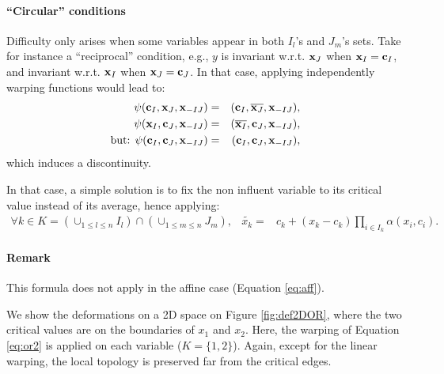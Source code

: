 \paragraph{``Circular'' conditions}
Difficulty only arises when some variables appear in both $I_l$'s and $J_m$'s sets. Take for instance a ``reciprocal'' condition, 
e.g., $y$ is invariant w.r.t. $\mathbf{x}_J$ when $\mathbf{x}_I=\mathbf{c}_I$, and invariant w.r.t. $\mathbf{x}_I$ when $\mathbf{x}_J=\mathbf{c}_J$.
In that case, applying independently warping functions would lead to: 
\begin{eqnarray*}
 \psi(\mathbf{c}_I, \mathbf{x}_J, \mathbf{x}_{-IJ}) &=& (\mathbf{c}_I, \overline{\mathbf{x}_J}, \mathbf{x}_{-IJ}),\\
 \psi(\mathbf{x}_I, \mathbf{c}_J, \mathbf{x}_{-IJ}) &=& (\overline{\mathbf{x}_I}, \mathbf{c}_J, \mathbf{x}_{-IJ}),\\
 \text{but: } \psi(\mathbf{c}_I, \mathbf{c}_J, \mathbf{x}_{-IJ}) &=& (\mathbf{c}_I, \mathbf{c}_J, \mathbf{x}_{-IJ}),
\end{eqnarray*}
which induces a discontinuity.

In that case, a simple solution is to fix the non influent variable to its critical value instead of its average, hence applying:
\begin{eqnarray}
 \forall k \in K= \left( \cup_{1 \leq l \leq n} I_l \right) \cap \left(\cup_{1 \leq m \leq n} J_m \right), &\widetilde{x_k} =& c_k + \left( x_k - c_k\right) \prod_{i \in I_k} \alpha(x_i, c_{i})\label{eq:or2}.
\end{eqnarray}

\paragraph{Remark} This formula does not apply in the affine case (Equation \ref{eq:aff}).

We show the deformations on a 2D space on Figure \ref{fig:def2DOR}, where the two critical values are on the boundaries of $x_1$ and $x_2$.
Here, the warping of Equation \ref{eq:or2} is applied on each variable ($K=\{1,2\}$). 
Again, except for the linear warping, the local topology is preserved far from the critical edges. 

